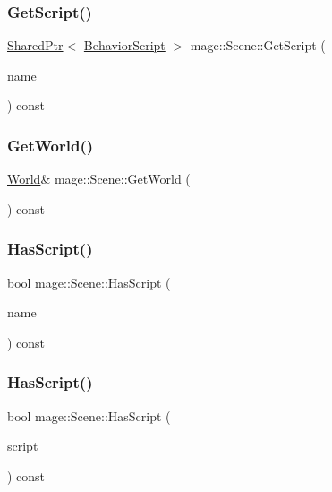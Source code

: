 \subsubsection{\texorpdfstring{Get\+Script()}{GetScript()}}
{\footnotesize\ttfamily \hyperlink{namespacemage_a1e01ae66713838a7a67d30e44c67703e}{Shared\+Ptr}$<$ \hyperlink{classmage_1_1_behavior_script}{Behavior\+Script} $>$ mage\+::\+Scene\+::\+Get\+Script (\begin{DoxyParamCaption}\item[{const string \&}]{name }\end{DoxyParamCaption}) const}

\hypertarget{classmage_1_1_scene_a0365a6a2e83519ad33280cc607408b4a}{}\label{classmage_1_1_scene_a0365a6a2e83519ad33280cc607408b4a} 
\subsubsection{\texorpdfstring{Get\+World()}{GetWorld()}}
{\footnotesize\ttfamily \hyperlink{classmage_1_1_world}{World}\& mage\+::\+Scene\+::\+Get\+World (\begin{DoxyParamCaption}{ }\end{DoxyParamCaption}) const}

\hypertarget{classmage_1_1_scene_ad87f96d612fa5087ad3ddcbb73ef05a4}{}\label{classmage_1_1_scene_ad87f96d612fa5087ad3ddcbb73ef05a4} 
\subsubsection{\texorpdfstring{Has\+Script()}{HasScript()}\hspace{0.1cm}{\footnotesize\ttfamily [1/2]}}
{\footnotesize\ttfamily bool mage\+::\+Scene\+::\+Has\+Script (\begin{DoxyParamCaption}\item[{const string \&}]{name }\end{DoxyParamCaption}) const}

\hypertarget{classmage_1_1_scene_a31469e19b181d0cb08bf10c554d28a6d}{}\label{classmage_1_1_scene_a31469e19b181d0cb08bf10c554d28a6d} 
\subsubsection{\texorpdfstring{Has\+Script()}{HasScript()}\hspace{0.1cm}{\footnotesize\ttfamily [2/2]}}
{\footnotesize\ttfamily bool mage\+::\+Scene\+::\+Has\+Script (\begin{DoxyParamCaption}\item[{const \hyperlink{namespacemage_a1e01ae66713838a7a67d30e44c67703e}{Shared\+Ptr}$<$ \hyperlink{classmage_1_1_behavior_script}{Behavior\+Script} $>$}]{script }\end{DoxyParamCaption}) const}

